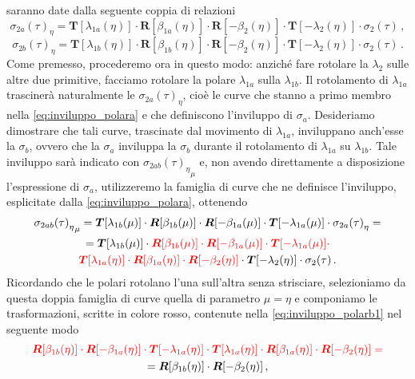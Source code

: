 saranno date dalla seguente coppia di relazioni
\begin{equation}
{\sigma_{2a}(\tau)}_\eta = 
 {\bm T}[\lambda_{1a}(\eta)]\cdot {\bm R}[\beta_{1a}(\eta)]\cdot{\bm R}[-\beta_2(\eta)]\cdot
 {\bm T} [-\lambda_2(\eta)]\cdot \sigma_2(\tau)\,,
\label{eq:inviluppo_polara}
\end{equation}
\begin{equation}
{\sigma_{2b}(\tau)}_\eta = 
 {\bm T}[\lambda_{1b}(\eta)]\cdot {\bm R}[\beta_{1b}(\eta)]\cdot{\bm R}[-\beta_2(\eta)]\cdot
 {\bm T} [-\lambda_2(\eta)]\cdot \sigma_2(\tau)\,.
\label{eq:inviluppo_polarb}
\end{equation}
\noindent Come premesso, procederemo ora in questo modo: anzich\'e fare rotolare 
la $\lambda_2$ sulle altre due primitive, facciamo rotolare la polare
$\lambda_{1a}$ sulla $\lambda_{1b}$. Il rotolamento di $\lambda_{1a}$
trasciner\`a naturalmente le
$\sigma_{2a}(\tau)_\eta$, cio\`e le curve che stanno a primo membro nella
\ref{eq:inviluppo_polara} e che definiscono l'inviluppo di $\sigma_a$.
Desideriamo dimostrare che tali curve, trascinate
dal movimento di $\lambda_{1a}$, inviluppano anch'esse la $\sigma_{b}$,
ovvero che la $\sigma_a$ inviluppa la $\sigma_b$ durante il rotolamento di 
$\lambda_{1a}$ su $\lambda_{1b}$.
Tale inviluppo sar\`a indicato con ${{\sigma_{2ab}(\tau)}_\eta}_\mu$
e, non avendo direttamente a disposizione l'espressione 
di $\sigma_a$, utilizzeremo la famiglia di curve che ne definisce l'inviluppo,
esplicitate dalla \ref{eq:inviluppo_polara}, ottenendo
\begin{multline}
{{\sigma_{2ab}(\tau)}_\eta}_\mu = 
 {\bm T}[\lambda_{1b}(\mu)]\cdot {\bm R}[\beta_{1b}(\mu)]\cdot{\bm R}[-\beta_{1a}(\mu)]\cdot
 {\bm T} [-\lambda_{1a}(\mu)]\cdot {\sigma_{2a}(\tau)}_\eta = \\
 = 
 {\bm T}[\lambda_{1b}(\mu)]\cdot\color{red} {\bm R}[\beta_{1b}(\mu)]\cdot{\bm R}[-\beta_{1a}(\mu)]\cdot
 {\bm T} [-\lambda_{1a}(\mu)]\cdot \\
\color{red} {\bm T}[\lambda_{1a}(\eta)]\cdot {\bm R}[\beta_{1a}(\eta)]\cdot{\bm R}[-\beta_2(\eta)] \color{black}\cdot
 {\bm T} [-\lambda_2(\eta)]\cdot \sigma_2(\tau)\,.
\label{eq:inviluppo_polarb1}
\end{multline}
\noindent Ricordando che le polari rotolano l'una sull'altra senza strisciare,
selezioniamo da questa doppia famiglia di curve quella di parametro
$\mu=\eta$ e componiamo le trasformazioni, scritte in colore rosso,
contenute nella \ref{eq:inviluppo_polarb1} nel seguente modo
\begin{multline}
\color{red} {\bm R}[\beta_{1b}(\eta)]\cdot{\bm R}[-\beta_{1a}(\eta)]\cdot
 {\bm T} [-\lambda_{1a}(\eta)]\cdot 
 {\bm T}[\lambda_{1a}(\eta)]\cdot {\bm R}[\beta_{1a}(\eta)]\cdot{\bm R}[-\beta_2(\eta)]=\\
={\bm R}[\beta_{1b}(\eta)]\cdot{\bm R}[-\beta_2(\eta)]\,, 
\label{eq:id}
\end{multline}
